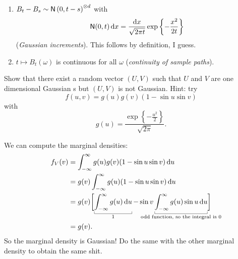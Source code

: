 \documentclass[12pt]{report}
\begin{document}
\begin{enumerate}
	\item $B_{t}-B_{s}\sim\mathsf{N}\left(0,t-s\right)^{\otimes d}$ with 
	\begin{equation*}
		\mathsf{N}(0,t)\mathop{}\!\mathrm{d} x =\frac{\mathop{}\!\mathrm{d} x}{\sqrt{2\pi t}}\exp\left\{-\frac{x^{2}}{2t}\right\}
	\end{equation*} (\emph{Gaussian increments}). This follows by definition, I guess.\hspace*{\fill}\faCheckCircle
	\item $t\mapsto B_{t}(\omega)$ is continuous for all $\omega$ (\emph{continuity of sample paths}).\hspace*{\fill}\faCheckCircle
\end{enumerate}
\begin{exercise}
	Show that there exist a random vector $(U,V)$ such that $U$ and $V$ are one dimensional Gaussian \rv s but $(U,V)$ is not Gaussian. Hint: try 
	\begin{equation*}
		f(u,v)=g(u)g(v)(1-\sin u\sin v)
	\end{equation*}
	with 
	\begin{equation*}
		g(u)=\frac{\exp\left\{-\frac{u^{2}}{2}\right\}}{\sqrt{2\pi}}.
	\end{equation*}
\end{exercise}
We can compute the marginal densities:
\begin{align*}
	f_{V}(v)&=\int_{-\infty}^{\infty}g(u)g(v)(1-\sin u\sin v)\du\\
	&=g(v)\int_{-\infty}^{\infty}g(u)(1-\sin u\sin v)\du\\
	&=g(v)\biggl[\ubracketthin{\int_{-\infty}^{\infty} g(u)\du}_{1}-\sin v\ubracketthin{\int_{-\infty}^{\infty}g(u)\sin u\du}_{\claptext{odd function, so the integral is 0}}\biggr]\\
	&=g(v).
\end{align*}
So the marginal density is Gaussian! Do the same with the other marginal density to obtain the same shit.
\end{document}
